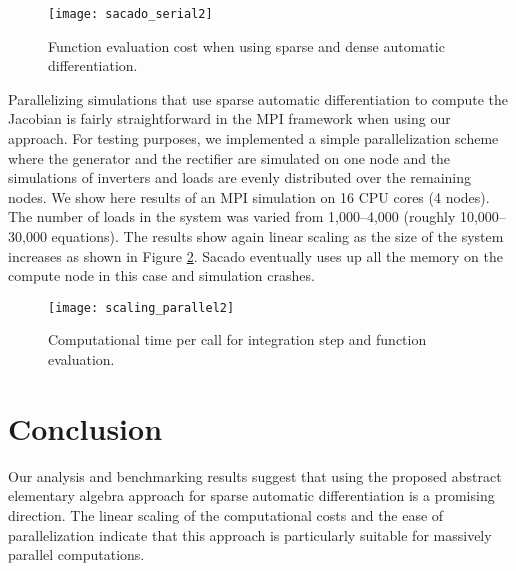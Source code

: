 \documentclass[10pt]{ijnam}
\theoremstyle{definition}
\begin{document}
\begin{figure}[htb]
\centering
    \texttt{[image: sacado\_serial2]} 
    \caption{Function evaluation cost when using sparse and dense automatic differentiation.} \label{fig:sacado}
\end{figure}

Parallelizing simulations that use sparse automatic differentiation 
to compute the Jacobian is fairly straightforward in the MPI framework when using our approach. For testing purposes, we implemented a simple parallelization scheme where the
generator and the rectifier are simulated on one node and the simulations of 
inverters and loads are evenly distributed over the remaining nodes. We 
show here results of an MPI simulation on 16 CPU cores (4 nodes). 
The number of loads in the system was varied from 1,000--4,000 (roughly 10,000--30,000 equations). The results show again linear scaling as the size of the system increases 
as shown in Figure \ref{fig:parallel}. 
Sacado eventually uses up all the memory on the 
compute node in this case and simulation crashes.

\begin{figure}[htb]
    \centering
    \texttt{[image: scaling\_parallel2]} 
    \caption{Computational time per call for integration step and function evaluation.}
    \label{fig:parallel}
\end{figure}


\section{Conclusion} \label{sec:conclusion}

Our analysis and benchmarking results suggest that using the proposed abstract
elementary algebra approach for sparse automatic differentiation is 
a promising direction. The linear scaling of the computational costs and
the ease of parallelization indicate that this approach is particularly
suitable for massively parallel computations. 
\end{document}
